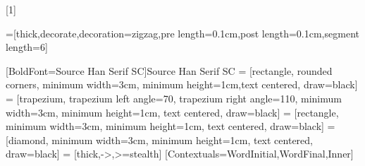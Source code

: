 \usepackage{amsmath}
\usepackage{amssymb}
\usepackage{bm}
\usepackage[heading=true]{ctex}
\usepackage{listings}
\usepackage{graphicx}
\usepackage{float}
\usepackage{subfigure}
\usepackage{subcaption}
\usepackage{multicol}
\usepackage{multirow}
\usepackage{rotating}
\usepackage{enumerate}
\usepackage{enumitem}
\usepackage{pifont}
\usepackage{ulem}
\usepackage{indentfirst}
\usepackage{tikz}
\usepackage[compatibility]{circuitikz}
\usepackage{siunitx}
\usepackage{subfiles}
\usepackage{chemmacros}
\usepackage{fontspec}
\usepackage{chemformula}
\usepackage{chemfig}
\usepackage{pgfplots}
\usepackage{upgreek}
\usepackage{xstring}
\usepackage{pdfpages}
\usepackage{environ}
[1]{%
  \immediate{}%
}
\usepackage[framemethod=tikz]{mdframed}
\setmainfont{Times New Roman}
\newcommand{\varparallel}{\mathrel{/\mkern-5mu/}}
\usetikzlibrary{arrows,shapes,automata,petri,positioning,calc,shapes.geometric,matrix}
\newcommand{\sourcehanserif}{\CJKfamily{songti}}
=[thick,decorate,decoration={zigzag,pre length=0.1cm,post
length=0.1cm,segment length=6}]
\usetikzlibrary{decorations.pathreplacing, decorations.markings}

[BoldFont=Source Han Serif SC]{Source Han Serif SC}
 = [rectangle, rounded corners, minimum width=3cm, minimum height=1cm,text centered, draw=black]
 = [trapezium, trapezium left angle=70, trapezium right angle=110, minimum width=3cm, minimum height=1cm, text centered, draw=black]
 = [rectangle, minimum width=3cm, minimum height=1cm, text centered, draw=black]
 = [diamond, minimum width=3cm, minimum height=1cm, text centered, draw=black]
 = [thick,->,>=stealth]
\newcommand{\dottedunderline}[1]{
  \tikz[baseline=(text.base)]{
    \node[inner sep=0pt,outer sep=0pt] (text) {#1};
    \foreach \x in {1,2,...,10} {
      \fill[black] ($(text.south west)!{(\x-0.5)/10}!(text.south east)$) circle (0.5pt);
    }
  }
}
\newcommand{\emphdot}[1]{%
  #1\raisebox{-1ex}{\llap{\textcolor{red}{\Pisymbol{pzd}{183}}\hspace{0.5em}}}%
}
\newcommand{\emphasize}[1]{%
  \foreach \n in {1,...,\numexpr\XeTeXcharglyph\XeTeXcharglyph} {%
    \underline{\phantom{#1}}%
  }%
}
\newfontfamily{}[Contextuals={WordInitial,WordFinal,Inner}]
\renewcommand{\texttt}[1]{{\small\menlo #1}}
